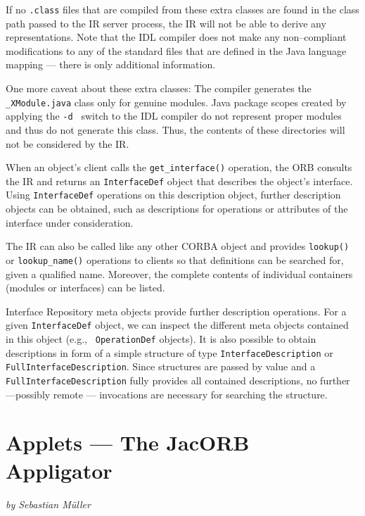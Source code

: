 \documentclass[12pt]{scrbook}
\begin{document}
If no  {\tt .class} files that  are compiled from  these extra classes
are found  in the class path passed  to the IR server  process, the IR
will not  be able  to derive any  representations.  Note that  the IDL
compiler does not make any non--compliant modifications to any of the
standard files that are defined in the Java language mapping --- there
is only additional information.

One more caveat about these  extra classes: The compiler generates the
{\tt  \_XModule.java} class  only  for genuine  modules. Java  package
scopes created by applying the {\tt -d } switch to the IDL compiler do
not  represent   proper  modules  and   thus  do  not   generate  this
class. Thus, the contents of  these directories will not be considered
by the IR.

When an  object's client  calls the {\tt  get\_interface()} operation,
the ORB consults the IR  and returns an {\tt InterfaceDef} object that
describes the object's  interface. Using {\tt InterfaceDef} operations
on  this  description  object,  further  description  objects  can  be
obtained,  such as descriptions  for operations  or attributes  of the
interface under consideration.

The IR  can also be  called like any  other CORBA object  and provides
{\tt lookup()}  or {\tt lookup\_name()} operations to  clients so that
definitions can be searched for, given a qualified name. Moreover, the
complete contents of individual containers (modules or interfaces) can
be listed.

Interface   Repository  meta   objects  provide   further  description
operations. For a given {\tt  InterfaceDef} object, we can inspect the
different  meta   objects  contained   in  this  object   (e.g.,  {\tt
OperationDef} objects). It is  also possible to obtain descriptions in
form of a simple structure  of type {\tt InterfaceDescription} or {\tt
FullInterfaceDescription}. Since structures are  passed by value and a
{\tt   FullInterfaceDescription}    fully   provides   all   contained
descriptions,  no  further  ---possibly  remote  ---  invocations  are
necessary for searching the structure.


\chapter{Applets --- The JacORB Appligator}
\label{Ch_applets}

{\em by Sebastian M{\"u}ller}
\end{document}
